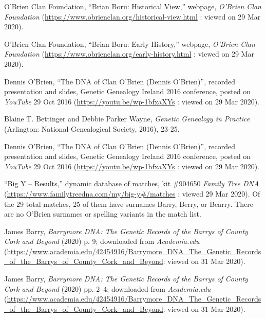 \begin{thebibliography}{999}
	\raggedright
	\small


O'Brien Clan Foundation, ``Brian Boru: Historical View,'' webpage, \textit{O'Brien Clan Foundation} (\url{https://www.obrienclan.org/historical-view.html} : viewed on 29 Mar 2020).

O'Brien Clan Foundation, ``Brian Boru: Early History,'' webpage, \textit{O'Brien Clan Foundation} (\url{https://www.obrienclan.org/early-history.html} : viewed on 29 Mar 2020).

Dennis O'Brien, ``The DNA of Clan O'Brien (Dennis O'Brien)'', recorded presentation and slides, Genetic Genealogy Ireland 2016 conference, posted on \textit{YouTube} 29 Oct 2016 (\url{https://youtu.be/wp-1bfxaXYs} : viewed on 29 Mar 2020).	

Blaine T. Bettinger and Debbie Parker Wayne, \textit{Genetic Genealogy in Practice} (Arlington: National Genealogical Society, 2016), 23-25.

Dennis O'Brien, ``The DNA of Clan O'Brien (Dennis O'Brien)'', recorded presentation and slides, Genetic Genealogy Ireland 2016 conference, posted on \textit{YouTube} 29 Oct 2016 (\url{https://youtu.be/wp-1bfxaXYs} : viewed on 29 Mar 2020).

``Big Y -- Results,'' dynamic database of matches, kit \#904650 \textit{Family Tree DNA} (\url{https://www.familytreedna.com/my/big-y\#/matches} : viewed 29 Mar 2020). Of the 29 total matches, 25 of them have surnames Barry, Berry, or Bearry. There are no O'Brien surnames or spelling variants in the match list.

James Barry, \textit{Barrymore DNA: The Genetic Records of the Barrys of County Cork and Beyond} (2020) p. 9; downloaded from \textit{Academia.edu} (\url{https://www.academia.edu/42454916/Barrymore_DNA_The_Genetic_Records_of_the_Barrys_of_County_Cork_and_Beyond}: viewed on 31 Mar 2020).

James Barry, \textit{Barrymore DNA: The Genetic Records of the Barrys of County Cork and Beyond} (2020) pp. 2--4; downloaded from \textit{Academia.edu} (\url{https://www.academia.edu/42454916/Barrymore_DNA_The_Genetic_Records_of_the_Barrys_of_County_Cork_and_Beyond}: viewed on 31 Mar 2020).


\end{thebibliography}
